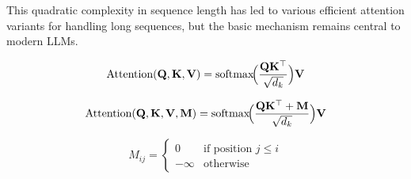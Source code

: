 This quadratic complexity in sequence length has led to various efficient attention variants for handling long sequences, but the basic mechanism remains central to modern LLMs.

\begin{equation}\label{eq:attention_mechanism}
\text{Attention}(\mathbf{Q}, \mathbf{K}, \mathbf{V}) = \text{softmax}\!\Bigl(\frac{\mathbf{Q}\mathbf{K}^\top}{\sqrt{d_k}}\Bigr)\mathbf{V}
\end{equation}

\begin{equation}\label{eq:masked_attention}
\text{Attention}(\mathbf{Q}, \mathbf{K}, \mathbf{V}, \mathbf{M}) 
= \text{softmax}\!\Bigl(\frac{\mathbf{Q} \mathbf{K}^\top + \mathbf{M}}{\sqrt{d_k}}\Bigr) \mathbf{V}
\end{equation}

\begin{equation}\label{eq:mask_matrix}
M_{ij} = \begin{cases}
    0 & \text{if position } j \leq i \\
    -\infty & \text{otherwise}
\end{cases}
\end{equation}
